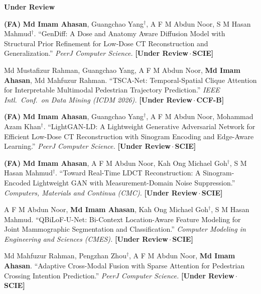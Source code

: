 \documentclass[11pt,a4paper]{article}
\newcommand{\pubsub}[1]{\vspace{4pt}\textbf{#1}\vspace{1pt}}
\begin{document}
\pubsub{Under Review}

\begin{description}[leftmargin=3.0em, labelwidth=2.6em, labelsep=0.4em,
                    itemsep=5pt, topsep=2pt, parsep=0pt]

\item[{\textbf{[R1]}}] \textbf{(FA)} \textbf{Md Imam Ahasan}, Guangchao Yang$^\dagger$,
  A F M Abdun Noor, S M Hasan Mahmud$^\dagger$.
  ``GenDiff: A Dose and Anatomy Aware Diffusion Model with Structural Prior Refinement
  for Low-Dose CT Reconstruction and Generalization.''
  \textit{PeerJ Computer Science.} \textbf{[Under Review\,$\cdot$\,SCIE]}

\item[{\textbf{[R2]}}] Md Mustafizur Rahman, Guangchao Yang,
  A F M Abdun Noor, \textbf{Md Imam Ahasan}, Md Mahfuzur Rahman.
  ``TSCA-Net: Temporal-Spatial Clique Attention for Interpretable Multimodal Pedestrian Trajectory Prediction.''
  \textit{IEEE Intl.\ Conf.\ on Data Mining (ICDM 2026).}
  \textbf{[Under Review\,$\cdot$\,CCF-B]}

\item[{\textbf{[R3]}}] \textbf{(FA)} \textbf{Md Imam Ahasan}, Guangchao Yang$^\dagger$,
  A F M Abdun Noor, Mohammad Azam Khan$^\dagger$.
  ``LightGAN-LD: A Lightweight Generative Adversarial Network for Efficient Low-Dose CT
  Reconstruction with Sinogram Encoding and Edge-Aware Learning.''
  \textit{PeerJ Computer Science.} \textbf{[Under Review\,$\cdot$\,SCIE]}

\item[{\textbf{[R4]}}] \textbf{(FA)} \textbf{Md Imam Ahasan},
  A F M Abdun Noor, Kah Ong Michael Goh$^\dagger$, S M Hasan Mahmud$^\dagger$.
  ``Toward Real-Time LDCT Reconstruction: A Sinogram-Encoded Lightweight GAN with
  Measurement-Domain Noise Suppression.''
  \textit{Computers, Materials and Continua (CMC).} \textbf{[Under Review\,$\cdot$\,SCIE]}

\item[{\textbf{[R5]}}] A F M Abdun Noor, \textbf{Md Imam Ahasan},
  Kah Ong Michael Goh$^\dagger$, S M Hasan Mahmud.
  ``QBiLoF-U-Net: Bi-Context Location-Aware Feature Modeling for Joint Mammographic
  Segmentation and Classification.''
  \textit{Computer Modeling in Engineering and Sciences (CMES).}
  \textbf{[Under Review\,$\cdot$\,SCIE]}

\item[{\textbf{[R6]}}] Md Mahfuzur Rahman, Pengzhan Zhou$^\dagger$,
  A F M Abdun Noor, \textbf{Md Imam Ahasan}.
  ``Adaptive Cross-Modal Fusion with Sparse Attention for Pedestrian Crossing Intention
  Prediction.'' \textit{PeerJ Computer Science.} \textbf{[Under Review\,$\cdot$\,SCIE]}

\end{description}
\end{document}
